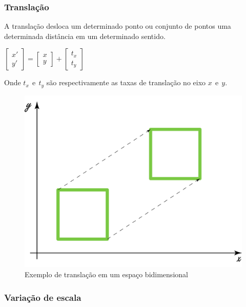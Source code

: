\documentclass[9pt, a4paper, nofonttune, journal]{IEEEtran}
\begin{document}
\subsubsection{Translação}
A translação desloca um determinado ponto ou conjunto de pontos uma determinada distância em um determinado sentido.

\begin{center}
$\begin{bmatrix}x'\\
y'
\end{bmatrix}=\begin{bmatrix}x\\
y
\end{bmatrix}+\begin{bmatrix}t_{x}\\
t_{y}
\end{bmatrix}$\end{center}
Onde $t_{x}~~ \textrm{e} ~~ t_{y}$ são respectivamente as taxas de translação no eixo $x~~ \textrm{e} ~~y$.\cite{CGPPBook1}


\begin{figure}[H]
\begin{center}
\includegraphics[scale=0.25]{figuras/translation1}
\caption{Exemplo de translação em um espaço bidimensional}
\end{center}
\end{figure}

\subsubsection{Variação de escala}
\end{document}
